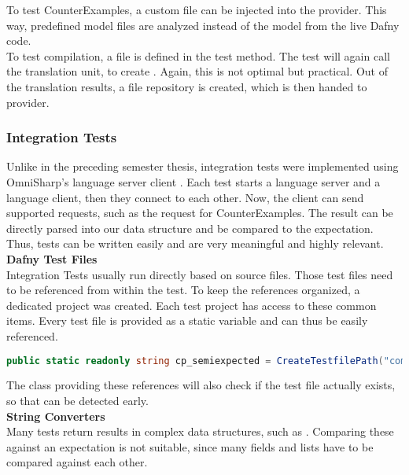 To test CounterExamples, a custom  file can be injected into the provider.
This way, predefined model files are analyzed instead of the model from the live Dafny code.\\

To test compilation, a  file is defined in the test method.
The test will again call the translation unit, to create .
Again, this is not optimal but practical.
Out of the translation results, a file repository is created, which is then handed to provider.



\subsubsection{Integration Tests}

Unlike in the preceding semester thesis, integration tests were implemented using OmniSharp's language server client \cite{omnisharpClient}.
Each test starts a language server and a language client, then they connect to each other.
Now, the client can send supported requests, such as the request for CounterExamples.
The result can be directly parsed into our  data structure and be compared to the expectation.
Thus, tests can be written easily and are very meaningful and highly relevant.\\

\textbf{Dafny Test Files}\\
Integration Tests usually run directly based on  source files.
Those test files need to be referenced from within the test.
To keep the references organized, a dedicated project  was created.
Each test project has access to these common items.
Every test file is provided as a static variable and can thus be easily referenced.

\begin{lstlisting}[language=csharp, caption={Test File Reference}, captionpos=b, label={lst:semiExpectedCodeThing}]
public static readonly string cp_semiexpected = CreateTestfilePath("compile/semi_expected_error.dfy");
\end{lstlisting}
The class providing these references will also check if the test file actually exists, so that  can be detected early.\\

\textbf{String Converters}\\
Many tests return results in complex data structures, such as .
Comparing these against an expectation is not suitable, since many fields and lists have to be compared against each other.\\

